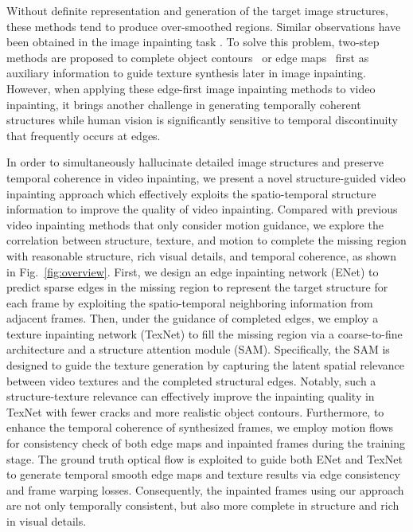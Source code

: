 Without definite representation and generation of the target image structures, these methods tend to produce over-smoothed regions. 
Similar observations have been obtained in the image inpainting task \cite{Xiong_2019_CVPR,nazeri2019edgeconnect}.
To solve this problem, two-step methods are proposed to complete object contours~\cite{Xiong_2019_CVPR} or edge maps~\cite{nazeri2019edgeconnect} first as auxiliary information to guide texture synthesis later in image inpainting.
%
However, when applying these edge-first image inpainting methods to video inpainting, it brings another challenge in generating temporally coherent structures while human vision is significantly sensitive to temporal discontinuity that frequently occurs at edges. 


In order to simultaneously hallucinate detailed image structures and preserve temporal coherence in video inpainting, we present a novel structure-guided video inpainting approach which effectively exploits the spatio-temporal structure information to improve the quality of video inpainting.  
%
Compared with previous video inpainting methods that only consider motion guidance, we explore the correlation between structure, texture, and motion to complete the missing region with reasonable structure, rich visual details, and temporal coherence, as shown in Fig.~\ref{fig:overview}.
First, we design an edge inpainting network (ENet) to predict sparse edges in the missing region to represent the target structure for each frame by exploiting the spatio-temporal neighboring information from adjacent frames.
Then, under the guidance of completed edges, we employ a texture inpainting network (TexNet) to fill the missing region via a coarse-to-fine architecture and a structure attention module (SAM).
Specifically, the SAM is designed to guide the texture generation by capturing the latent spatial relevance between video textures and the completed structural edges.
Notably, such a structure-texture relevance can effectively improve the inpainting quality in TexNet with fewer cracks and more realistic object contours.
Furthermore, to enhance the temporal coherence of synthesized frames, we employ motion flows for consistency check of both edge maps and inpainted frames during the training stage.
%
The ground truth optical flow is exploited to guide both ENet and TexNet to generate temporal smooth edge maps and texture results via edge consistency and frame warping losses.
Consequently, the inpainted frames using our approach are not only temporally consistent, but also more complete in structure and rich in visual details.

